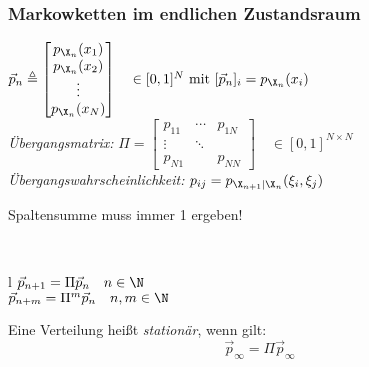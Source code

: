 \documentclass[german,color,6pt]{latex4ei/latex4ei_sheet}
\begin{document}
\begin{sectionbox}
	\subsubsection{Markowketten im endlichen Zustandsraum}
	$\vec{p}_{n} \triangleq \begin{bmatrix} p_{\X_{n}}(x_{1}) \\ p_{\X_{n}}(x_{2}) \\ \vdots \\ p_{\X_{n}}(x_{N}) \end{bmatrix} \quad \in [0,1]^{N}\text{ mit }[\vec{p}_{n}]_{i} = p_{\X_{n}}(x_{i})$ \\
	\emph{Übergangsmatrix:}
	 $\Pi = \begin{bmatrix} p_{11} & \cdots & p_{1N} \\ \vdots & \ddots &   \\ p_{N1} & & p_{NN} \end{bmatrix} \quad \in [0,1]^{N \times N}$\\

	 \emph{Übergangswahrscheinlichkeit:} $p_{ij} = p_{\X_{n+1}|\X_n}(\xi_i,\xi_j)$ \\
	 \centerline{Spaltensumme muss immer 1 ergeben!}\\
	 \begin{tablebox}{l}
		 $\vec{p}_{n+1}  = \Pi \vec{p}_{n} \quad n \in \N$ \\
		 $\vec{p}_{n+m}  = \Pi^{m} \vec{p}_{n} \quad n, m \in \N$
	 \end{tablebox}
	 Eine Verteilung heißt \emph{stationär}, wenn gilt:\\
	\[\vec{p}_{\infty}  = \Pi \vec{p}_{\infty} \]
\end{sectionbox}


\end{document}
